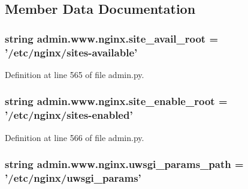\subsection{Member Data Documentation}
\hypertarget{classadmin_1_1www_1_1nginx_a0345aad76d9ddd6469c13bef207a9766}{
\subsubsection[{site\-\_\-avail\-\_\-root}]{\setlength{\rightskip}{0pt plus 5cm}string admin.\-www.\-nginx.\-site\-\_\-avail\-\_\-root = '/etc/{\bf nginx}/sites-\/available'\hspace{0.3cm}{\ttfamily [static]}}}\label{classadmin_1_1www_1_1nginx_a0345aad76d9ddd6469c13bef207a9766}


Definition at line 565 of file admin.\-py.

\hypertarget{classadmin_1_1www_1_1nginx_a3e1b0fbd45f31aaeacb6baaec80806ce}{
\subsubsection[{site\-\_\-enable\-\_\-root}]{\setlength{\rightskip}{0pt plus 5cm}string admin.\-www.\-nginx.\-site\-\_\-enable\-\_\-root = '/etc/{\bf nginx}/sites-\/enabled'\hspace{0.3cm}{\ttfamily [static]}}}\label{classadmin_1_1www_1_1nginx_a3e1b0fbd45f31aaeacb6baaec80806ce}


Definition at line 566 of file admin.\-py.

\hypertarget{classadmin_1_1www_1_1nginx_afd444548cd6faf42c56e24e22148a4b4}{
\subsubsection[{uwsgi\-\_\-params\-\_\-path}]{\setlength{\rightskip}{0pt plus 5cm}string admin.\-www.\-nginx.\-uwsgi\-\_\-params\-\_\-path = '/etc/{\bf nginx}/uwsgi\-\_\-params'\hspace{0.3cm}{\ttfamily [static]}}}\label{classadmin_1_1www_1_1nginx_afd444548cd6faf42c56e24e22148a4b4}


